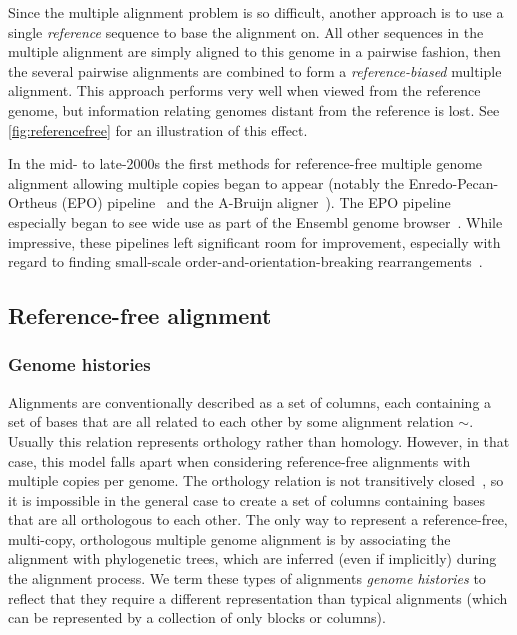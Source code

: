 \documentclass[fleqn,10pt]{wlscirep}
\begin{document}
Since the multiple alignment problem is so difficult, another approach is to use a single \emph{reference} sequence to base the alignment on.
All other sequences in the multiple alignment are simply aligned to this genome in a pairwise fashion, then the several pairwise alignments are combined to form a \emph{reference-biased} multiple alignment.
This approach performs very well when viewed from the reference genome, but information relating genomes distant from the reference is lost. See \ref{fig:referencefree} for an illustration of this effect.

In the mid- to late-2000s the first methods for reference-free multiple genome alignment allowing multiple copies began to appear (notably the Enredo-Pecan-Ortheus (EPO) pipeline~\cite{epo} and the A-Bruijn aligner~\cite{aBruijn}).
The EPO pipeline especially began to see wide use as part of the Ensembl genome browser~\cite{ensembl2017}.
While impressive, these pipelines left significant room for improvement, especially with regard to finding small-scale order-and-orientation-breaking rearrangements~\cite{epo}.

\subsection{Reference-free alignment}
\subsubsection{Genome histories}
Alignments are conventionally described as a set of columns, each containing a set of bases that are all related to each other by some alignment relation $\sim$.
Usually this relation represents orthology rather than homology.
However, in that case, this model falls apart when considering reference-free alignments with multiple copies per genome.
The orthology relation is not transitively closed~\cite{Koonin2005}, so it is impossible in the general case to create a set of columns containing bases that are all orthologous to each other.
The only way to represent a reference-free, multi-copy, orthologous multiple genome alignment is by associating the alignment with phylogenetic trees, which are inferred (even if implicitly) during the alignment process.
We term these types of alignments \emph{genome histories} to reflect that they require a different representation than typical alignments (which can be represented by a collection of only blocks or columns).
\end{document}
